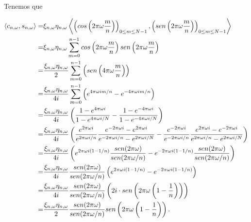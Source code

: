 \noindent
Tenemos que

\begin{align*}
\langle c_{n,\omega} , s_{n, \omega} \rangle = &
\xi_{n, \omega} \eta_{n, \omega} \left\langle 
\left( cos \left( 2 \pi \omega \frac{m }{n} \right) \right)_{0 \leq m \leq N-1} ,  
\left( sen \left( 2 \pi \omega \frac{m }{n}\right) \right)_{0 \leq m \leq N-1} \right\rangle \\
= & \xi_{n, \omega} \eta_{n, \omega} \sum\limits_{m=0}^{n-1}
cos \left(2 \pi \omega \frac{m}{n}\right) sen\left( 2 \pi \omega \frac{m}{n}\right) \\
= & \frac{\xi_{n, \omega} \eta_{n, \omega}}{2}
\sum\limits_{m=0}^{n-1}
\left( sen\left( 4 \pi \omega \frac{m}{n}\right) \right) \\
= & \frac{\xi_{n, \omega} \eta_{n, \omega}}{4i} \sum\limits_{m=0}^{n-1}
\left( e^{4 \pi \omega i m/n} - 
e^{-4 \pi \omega i m/n} \right) \\
= & \frac{\xi_{n, \omega} \eta_{n, \omega}}{4i} 
\left(
\frac{1-e^{4 \pi \omega i }}{1-e^{4 \pi \omega i /N}} - 
\frac{1-e^{-4 \pi \omega i }}{1-e^{-4 \pi \omega i /N}} 
\right) \\
= & \frac{\xi_{n, \omega} \eta_{n, \omega}}{4i} 
\left(
\frac{e^{2 \pi \omega i }}{e^{2 \pi \omega i/n }}
\frac{e^{-2 \pi \omega i }-e^{2 \pi \omega i }}{e^{-2 \pi \omega i/n }-e^{2 \pi \omega i /N}} - 
\frac{e^{-2 \pi \omega i }}{e^{-2 \pi \omega i/n }}
\frac{e^{2 \pi \omega i }-e^{-2 \pi \omega i }}{e^{2 \pi \omega i/n }-e^{2 \pi \omega i /N}} 
\right) \\
= & 
\frac{\xi_{n, \omega} \eta_{n, \omega}}{4i} 
\left(
e^{2 \pi \omega i \left( 1-1/n \right)}
\frac{sen(2 \pi \omega)}{sen(2 \pi \omega /n)} - 
e^{-2 \pi \omega i \left( 1-1/n \right)}
\frac{sen(2 \pi \omega)}{sen(2 \pi \omega /n)}
\right) 
\\
= & 
\frac{\xi_{n, \omega} \eta_{n, \omega}}{4i} 
\frac{sen(2 \pi \omega)}{sen(2 \pi \omega /n)}
\left(
e^{2 \pi \omega i \left( 1-1/n \right)} - e^{-2 \pi \omega i \left( 1-1/n \right)}
\right) \\
= &
\frac{\xi_{n, \omega} \eta_{n, \omega}}{4i} 
\frac{sen(2 \pi \omega)}{sen(2 \pi \omega /n)}
\left(
2i \cdot  sen \left( 2 \pi \omega  \left( 1- \frac{1}{n} \right) \right)
\right)\\
= & 
\frac{\xi_{n, \omega} \eta_{n, \omega}}{2} 
\frac{sen(2 \pi \omega)}{sen(2 \pi \omega /n)}
sen \left( 2 \pi \omega  \left( 1- \frac{1}{n} \right) \right). \\
\end{align*}
\QEDB
\vspace{0.2cm}



